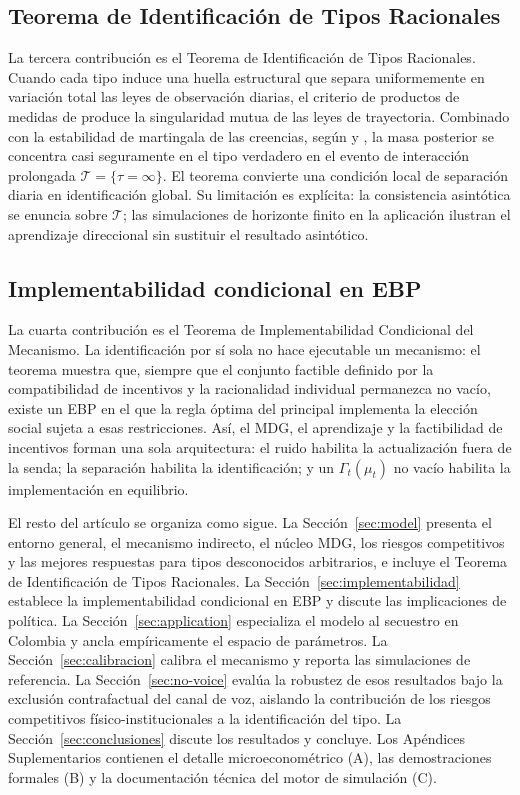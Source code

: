 \documentclass[pdflatex,sn-mathphys-ay]{sn-jnl}
\theoremstyle{thmstyleone}
\theoremstyle{thmstyletwo}
\theoremstyle{thmstylethree}
\newcommand{\1}{\mathbf{1}}
\begin{document}
\subsection*{Teorema de Identificación de Tipos Racionales}
La tercera contribución es el Teorema de Identificación de Tipos Racionales. Cuando cada tipo induce una huella estructural que separa uniformemente en variación total las leyes de observación diarias, el criterio de productos de medidas de \citet{Kakutani1948} produce la singularidad mutua de las leyes de trayectoria. Combinado con la estabilidad de martingala de las creencias, según \citet{Doob1953Stochastic} y \citet{BlackwellDubins1962}, la masa posterior se concentra casi seguramente en el tipo verdadero en el evento de interacción prolongada $\mathcal{T}=\{\tau=\infty\}$. El teorema convierte una condición local de separación diaria en identificación global. Su limitación es explícita: la consistencia asintótica se enuncia sobre $\mathcal{T}$; las simulaciones de horizonte finito en la aplicación ilustran el aprendizaje direccional sin sustituir el resultado asintótico.

\subsection*{Implementabilidad condicional en EBP}
La cuarta contribución es el Teorema de Implementabilidad Condicional del Mecanismo. La identificación por sí sola no hace ejecutable un mecanismo: el teorema muestra que, siempre que el conjunto factible definido por la compatibilidad de incentivos y la racionalidad individual permanezca no vacío, existe un EBP en el que la regla óptima del principal implementa la elección social sujeta a esas restricciones. Así, el MDG, el aprendizaje y la factibilidad de incentivos forman una sola arquitectura: el ruido habilita la actualización fuera de la senda; la separación habilita la identificación; y un $\Gamma_t(\mu_t)$ no vacío habilita la implementación en equilibrio.

El resto del artículo se organiza como sigue. La Sección~\ref{sec:model} presenta el entorno general, el mecanismo indirecto, el núcleo MDG, los riesgos competitivos y las mejores respuestas para tipos desconocidos arbitrarios, e incluye el Teorema de Identificación de Tipos Racionales. La Sección~\ref{sec:implementabilidad} establece la implementabilidad condicional en EBP y discute las implicaciones de política. La Sección~\ref{sec:application} especializa el modelo al secuestro en Colombia y ancla empíricamente el espacio de parámetros. La Sección~\ref{sec:calibracion} calibra el mecanismo y reporta las simulaciones de referencia. La Sección~\ref{sec:no-voice} evalúa la robustez de esos resultados bajo la exclusión contrafactual del canal de voz, aislando la contribución de los riesgos competitivos físico-institucionales a la identificación del tipo. La Sección~\ref{sec:conclusiones} discute los resultados y concluye. Los Apéndices Suplementarios contienen el detalle microeconométrico (A), las demostraciones formales (B) y la documentación técnica del motor de simulación (C).
\end{document}
